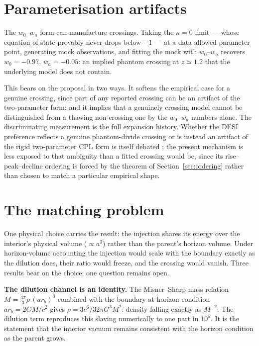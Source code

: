 \documentclass[11pt,a4paper]{article}
\begin{document}
\section{Parameterisation artifacts}\label{sec:artifacts}

The $w_0$--$w_a$ form can manufacture crossings. Taking the $\kappa=0$ limit --- whose equation of state provably never drops below $-1$ --- at a data-allowed parameter point, generating mock observations, and fitting the mock with $w_0$--$w_a$ recovers $w_0=-0.97$, $w_a=-0.05$: an implied phantom crossing at $z\simeq1.2$ that the underlying model does not contain.

This bears on the proposal in two ways. It softens the empirical case for a genuine crossing, since part of any reported crossing can be an artifact of the two-parameter form; and it implies that a genuinely crossing model cannot be distinguished from a thawing non-crossing one by the $w_0$--$w_a$ numbers alone. The discriminating measurement is the full expansion history. Whether the DESI preference reflects a genuine phantom-divide crossing or is instead an artifact of the rigid two-parameter CPL form is itself debated \citep{Gialamas2025,DindaMaartens2025}; the present mechanism is less exposed to that ambiguity than a fitted crossing would be, since its rise--peak--decline ordering is forced by the theorem of Section~\ref{sec:ordering} rather than chosen to match a particular empirical shape.

\section{The matching problem}\label{sec:matching}

One physical choice carries the result: the injection shares its energy over the interior's physical volume ($\propto a^3$) rather than the parent's horizon volume. Under horizon-volume accounting the injection would scale with the boundary exactly as the dilution does, their ratio would freeze, and the crossing would vanish. Three results bear on the choice; one question remains open.

\textbf{The dilution channel is an identity.} The Misner--Sharp mass relation \citep{MisnerSharp1964} $M=\tfrac{4\pi}{3}\rho\,(a r_b)^3$ combined with the boundary-at-horizon condition $a r_b = 2GM/c^2$ gives $\rho = 3c^6/32\pi G^3 M^2$: density falling exactly as $M^{-2}$. The dilution term reproduces this slaving numerically to one part in $10^5$. It is the statement that the interior vacuum remains consistent with the horizon condition as the parent grows.
\end{document}
